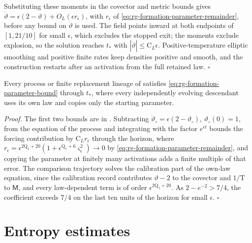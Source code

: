 Substituting these moments in the covector and metric bounds gives
\(\dot\vartheta=\epsilon(2-\vartheta)+O_L(\epsilon r_\epsilon)\), with
\(r_\epsilon\) of \cref{eq:rg-formation-parameter-remainder}, before any bound
on \(\dot\vartheta\) is used. The field points inward at both endpoints of
\([1,21/10]\) for small \(\epsilon\), which excludes the stopped exit; the
moments exclude explosion, so the solution reaches \(t_*\) with
\(|\dot\vartheta|\le\mathrm C_L\epsilon\). Positive-temperature elliptic
smoothing and positive finite rates keep densities positive and smooth, and
the construction restarts after an activation from the full retained law.
\hfill\(\square\)

Every process or finite replacement lineage of
 satisfies
\cref{eq:rg-formation-parameter-bound} through \(t_*\), where every
independently evolving descendant uses its own law and copies only the
starting parameter. 

\noindent\emph{Proof.}
The first two bounds are in .
Subtracting \(\dot\vartheta_\circ=\epsilon(2-\vartheta_\circ)\),
\(\vartheta_\circ(0)=1\), from the equation of the process and integrating
with the factor \(e^{\epsilon t}\) bounds the forcing contribution by
\(\mathrm C_Lr_\epsilon\) through the horizon, where
\(r_\epsilon=\epsilon^{2\mathrm Q_1+20}(1+\epsilon^{\mathrm Q_1+6}\varsigma_\epsilon^2)\to0\)
by \cref{eq:rg-formation-parameter-remainder}, and copying the parameter at
finitely many activations adds a finite multiple of that error. The
comparison trajectory solves the calibration part of the own-law equation,
since the calibration record contributes \(\vartheta-2\) to the covector and
\(1/\mathrm T\) to \(\mathsf M\), and every law-dependent term is of order
\(\epsilon^{2\mathrm Q_1+20}\). As \(2-e^{-2}>7/4\), the coefficient exceeds
\(7/4\) on the last ten units of the horizon for small \(\epsilon\).
\hfill\(\square\)

\section{Entropy estimates}
\label{sec:rg-formation-entropy-proof}

